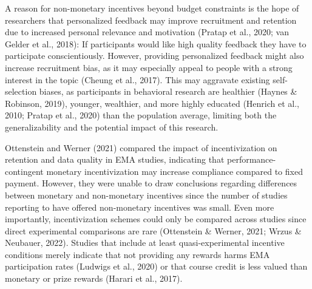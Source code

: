 \documentclass[authordate, empirical]{jote-new-article}
\begin{document}
	A reason for non-monetary incentives beyond budget constraints is the hope of researchers that personalized feedback may improve recruitment and retention due to increased personal relevance and motivation (Pratap et al., 2020; van Gelder et al., 2018): If participants would like high quality feedback they have to participate conscientiously. However, providing personalized feedback might also increase recruitment bias, as it may especially appeal to people with a strong interest in the topic (Cheung et al., 2017). This may aggravate existing self-selection biases, as participants in behavioral research are healthier (Haynes \& Robinson, 2019), younger, wealthier, and more highly educated (Henrich et al., 2010; Pratap et al., 2020) than the population average, limiting both the generalizability and the potential impact of this research.



	Ottenstein and Werner (2021) compared the impact of incentivization on retention and data quality in EMA studies, indicating that performance-contingent monetary incentivization may increase compliance compared to fixed payment. However, they were unable to draw conclusions regarding differences between monetary and non-monetary incentives since the number of studies reporting to have offered non-monetary incentives was small. Even more importantly, incentivization schemes could only be compared across studies since direct experimental comparisons are rare (Ottenstein \& Werner, 2021; Wrzus \& Neubauer, 2022). Studies that include at least quasi-experimental incentive conditions merely indicate that not providing any rewards harms EMA participation rates (Ludwigs et al., 2020) or that course credit is less valued than monetary or prize rewards (Harari et al., 2017).
\end{document}
